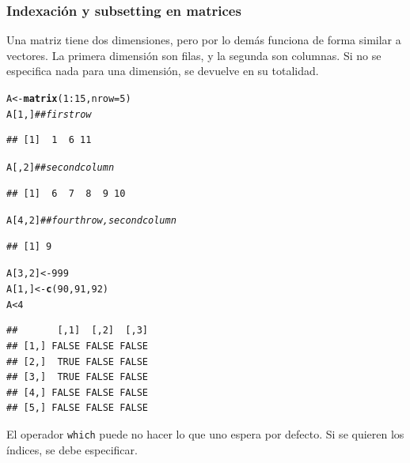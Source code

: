 \documentclass{config/apuntes}\usepackage[]{graphicx}\usepackage[]{xcolor}
\makeatletter
\newcommand{\hlnum}[1]{\textcolor[rgb]{0.686,0.059,0.569}{#1}}%
\newcommand{\hlcom}[1]{\textcolor[rgb]{0.678,0.584,0.686}{\textit{#1}}}%
\newcommand{\hlopt}[1]{\textcolor[rgb]{0,0,0}{#1}}%
\newcommand{\hldef}[1]{\textcolor[rgb]{0.345,0.345,0.345}{#1}}%
\newcommand{\hlkwb}[1]{\textcolor[rgb]{0.69,0.353,0.396}{#1}}%
\newcommand{\hlkwc}[1]{\textcolor[rgb]{0.333,0.667,0.333}{#1}}%
\newcommand{\hlkwd}[1]{\textcolor[rgb]{0.737,0.353,0.396}{\textbf{#1}}}%
\newenvironment{kframe}{%
 \def\at@end@of@kframe{}%
 \ifinner\ifhmode%
  \def\at@end@of@kframe{\end{minipage}}%
  \begin{minipage}{\columnwidth}%
 \fi\fi%
 \def\FrameCommand##1{\hskip\@totalleftmargin \hskip-\fboxsep
 \colorbox{shadecolor}{##1}\hskip-\fboxsep
     \hskip-\linewidth \hskip-\@totalleftmargin \hskip\columnwidth}%
 \MakeFramed {\advance\hsize-\width
   \@totalleftmargin\z@ \linewidth\hsize
   \@setminipage}}%
 {\par\unskip\endMakeFramed%
 \at@end@of@kframe}
\newenvironment{knitrout}{}{} %
\newcommand{\code}[1]{\texttt{#1}}
\makeatother
\begin{document}
\subsubsection{Indexación y subsetting en matrices}
Una matriz tiene dos dimensiones, pero por lo demás funciona de forma similar a vectores. La primera dimensión son filas, y la segunda son columnas. Si no se especifica nada para una dimensión, se devuelve en su totalidad.
\begin{knitrout}
\color{fgcolor}\begin{kframe}
\begin{alltt}
\hldef{A} \hlkwb{<-} \hlkwd{matrix}\hldef{(}\hlnum{1}\hlopt{:}\hlnum{15}\hldef{,} \hlkwc{nrow} \hldef{=} \hlnum{5}\hldef{)}
\hldef{A[}\hlnum{1}\hldef{, ]} \hlcom{## first row}
\end{alltt}
\begin{verbatim}
## [1]  1  6 11
\end{verbatim}
\begin{alltt}
\hldef{A[,} \hlnum{2}\hldef{]} \hlcom{## second column}
\end{alltt}
\begin{verbatim}
## [1]  6  7  8  9 10
\end{verbatim}
\begin{alltt}
\hldef{A[}\hlnum{4}\hldef{,} \hlnum{2}\hldef{]} \hlcom{## fourth row, second column}
\end{alltt}
\begin{verbatim}
## [1] 9
\end{verbatim}
\begin{alltt}
\hldef{A[}\hlnum{3}\hldef{,} \hlnum{2}\hldef{]} \hlkwb{<-} \hlnum{999}
\hldef{A[}\hlnum{1}\hldef{, ]} \hlkwb{<-} \hlkwd{c}\hldef{(}\hlnum{90}\hldef{,} \hlnum{91}\hldef{,} \hlnum{92}\hldef{)}
\hldef{A} \hlopt{<} \hlnum{4}
\end{alltt}
\begin{verbatim}
##       [,1]  [,2]  [,3]
## [1,] FALSE FALSE FALSE
## [2,]  TRUE FALSE FALSE
## [3,]  TRUE FALSE FALSE
## [4,] FALSE FALSE FALSE
## [5,] FALSE FALSE FALSE
\end{verbatim}
\end{kframe}
\end{knitrout}

El operador \code{which} puede no hacer lo que uno espera por defecto. Si se quieren los índices, se debe especificar.
\end{document}
